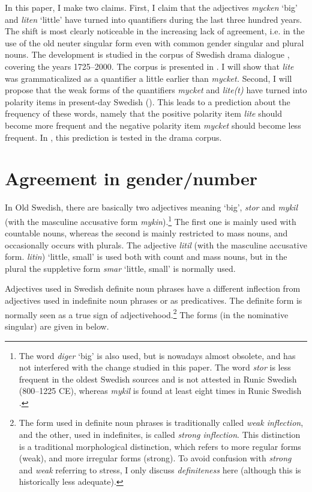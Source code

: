 \documentclass[output=paper]{langscibook}
\begin{document}
In this paper, I make two claims. First, I claim that the adjectives \textit{mycken} ‘big’ and \textit{liten} ‘little’ have turned into quantifiers during the last three hundred years. The shift is most clearly noticeable in the increasing lack of agreement, i.e. in the use of the old neuter singular form even with common gender singular and plural nouns. The development is studied in the corpus of Swedish drama dialogue \citep{MarttalaStromquist2001}, covering the years 1725–2000. The corpus is presented in . I will show that \textit{lite} was grammaticalized as a quantifier a little earlier than \textit{mycket.} Second, I will propose that the weak forms of the quantifiers \textit{mycket} and \textit{lite(t)} have turned into polarity items in present-day Swedish (). This leads to a prediction about the frequency of these words, namely that the positive polarity item \textit{lite} should become more frequent and the negative polarity item \textit{mycket} should become less frequent. In , this prediction is tested in the drama corpus.


\section{Agreement in gender/number}\label{sec:delsing:2}


In Old Swedish, there are basically two adjectives meaning ‘big’, \textit{stor} and \textit{mykil} (with the masculine accusative form \textit{mykin}).\footnote{The word \textit{diger} ‘big’ is also used, but  is nowadays almost obsolete, and has not interfered with the change studied in this paper. The word \textit{stor} is less frequent in the oldest Swedish sources and is not attested in Runic Swedish (800–1225 CE), whereas \textit{mykil} is found at least eight times in Runic Swedish \citep{Peterson2006}.}  The first one is mainly used with countable nouns, whereas the second is mainly restricted to mass nouns, and occasionally occurs with plurals. The adjective \textit{litil} (with the masculine accusative form. \textit{litin}) ‘little, small’ is used both with count and mass nouns, but in the plural the suppletive form \textit{smar} ‘little, small’ is normally used.



Adjectives used in Swedish definite noun phrases have a different inflection from adjectives used in indefinite noun phrases or as predicatives. The definite form is normally seen as a true sign of adjectivehood.\footnote{The form used in definite noun phrases is traditionally called \textit{weak inflection}, and the other, used in indefinites, is called \textit{strong inflection}. This distinction is a traditional morphological distinction, which refers to more regular forms (weak), and more irregular forms (strong). To avoid confusion with \textit{strong} and \textit{weak} referring to stress, I only discuss \textit{definiteness} here (although this is historically less adequate).} The forms (in the nominative singular) are given in  below.
\end{document}
